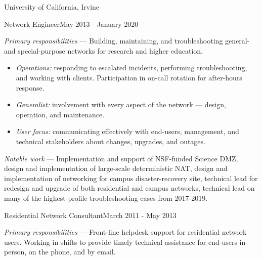 \documentclass[10pt]{article}
\newenvironment{employer_set}[1]{\newcommand{\employer}[0]{{#1}}}{}
\newenvironment{title_itemize}[2]
{
	\noindent{}\textbf{\employer{}}\hfill{}{#2}\\
	\noindent{#1}

	\begin{itemize}[leftmargin=2em, labelindent=\parindent]
}
{
	\end{itemize}
}
\begin{document}
\begin{employer_set}{University of California, Irvine}
	\begin{title_itemize}{Network Engineer}{May 2013 - January 2020}
		\item{}\emph{Primary responsibilities} --- Building, maintaining, and troubleshooting general- and special-purpose networks for research and higher education.
		\begin{itemize}
			\item{}\emph{Operations:} responding to escalated incidents, performing troubleshooting, and working with clients. Participation in on-call rotation for after-hours response.
			\item{}\emph{Generalist:} involvement with every aspect of the network --- design, operation, and maintenance.
			\item{}\emph{User focus:} communicating effectively with end-users, management, and technical stakeholders about changes, upgrades, and outages.
		\end{itemize}
	\item{}\emph{Notable work} --- Implementation and support of NSF-funded Science DMZ, design and implementation of large-scale deterministic NAT, design and implementation of networking for campus disaster-recovery site, technical lead for redesign and upgrade of both residential and campus networks, technical lead on many of the highest-profile troubleshooting cases from 2017-2019.
	\end{title_itemize}
	\begin{title_itemize}{Residential Network Consultant}{March 2011 - May 2013}
		\item{}\emph{Primary responsibilities} --- Front-line helpdesk support for residential network users. Working in shifts to provide timely technical assistance for end-users in-person, on the phone, and by email.
	\end{title_itemize}
\end{employer_set}
\end{document}
